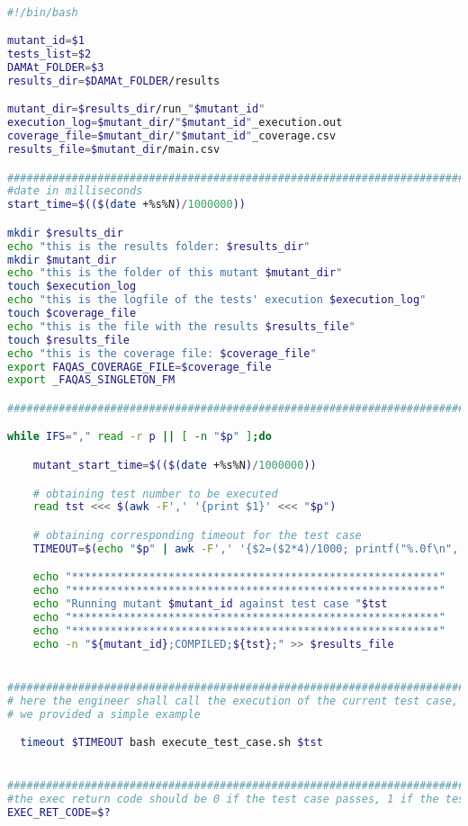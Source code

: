 \begin{lstlisting}[label={lst:run_tests},language=bash]

#!/bin/bash

mutant_id=$1
tests_list=$2
DAMAt_FOLDER=$3
results_dir=$DAMAt_FOLDER/results

mutant_dir=$results_dir/run_"$mutant_id"
execution_log=$mutant_dir/"$mutant_id"_execution.out
coverage_file=$mutant_dir/"$mutant_id"_coverage.csv
results_file=$mutant_dir/main.csv

###############################################################################
#date in milliseconds
start_time=$(($(date +%s%N)/1000000))

mkdir $results_dir
echo "this is the results folder: $results_dir"
mkdir $mutant_dir
echo "this is the folder of this mutant $mutant_dir"
touch $execution_log
echo "this is the logfile of the tests' execution $execution_log"
touch $coverage_file
echo "this is the file with the results $results_file"
touch $results_file
echo "this is the coverage file: $coverage_file"
export FAQAS_COVERAGE_FILE=$coverage_file
export _FAQAS_SINGLETON_FM

###############################################################################

while IFS="," read -r p || [ -n "$p" ];do

    mutant_start_time=$(($(date +%s%N)/1000000))

    # obtaining test number to be executed
    read tst <<< $(awk -F',' '{print $1}' <<< "$p")

    # obtaining corresponding timeout for the test case
    TIMEOUT=$(echo "$p" | awk -F',' '{$2=($2*4)/1000; printf("%.0f\n", $2);}')

    echo "*********************************************************"
    echo "*********************************************************"
    echo "Running mutant $mutant_id against test case "$tst
    echo "*********************************************************"
    echo "*********************************************************"
    echo -n "${mutant_id};COMPILED;${tst};" >> $results_file


###############################################################################
# here the engineer shall call the execution of the current test case,
# we provided a simple example

  timeout $TIMEOUT bash execute_test_case.sh $tst


###############################################################################
#the exec return code should be 0 if the test case passes, 1 if the test case fails, and 124 in case of a timeout
EXEC_RET_CODE=$?



\end{lstlisting}
